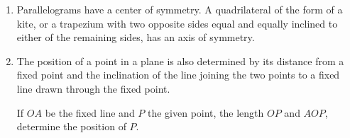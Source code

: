 \begin{enumerate}


\item Parallelograms have a center of symmetry.  A quadrilateral of the form of
    a kite, or a trapezium with two opposite sides equal and equally inclined to
    either of the remaining sides, has an axis of symmetry.


\item The position of a point in a plane is also determined by its distance from
    a fixed point and the inclination of the line joining the two points to a
    fixed line drawn through the fixed point.

    If $OA$ be the fixed line and $P$ the given point, the length $OP$ and $AOP$,
    determine the position of $P$.

%
%
%
%
%
%
%
%
%
%
%
%
%
%
%
%
%
%
%
%
%

\end{enumerate}
